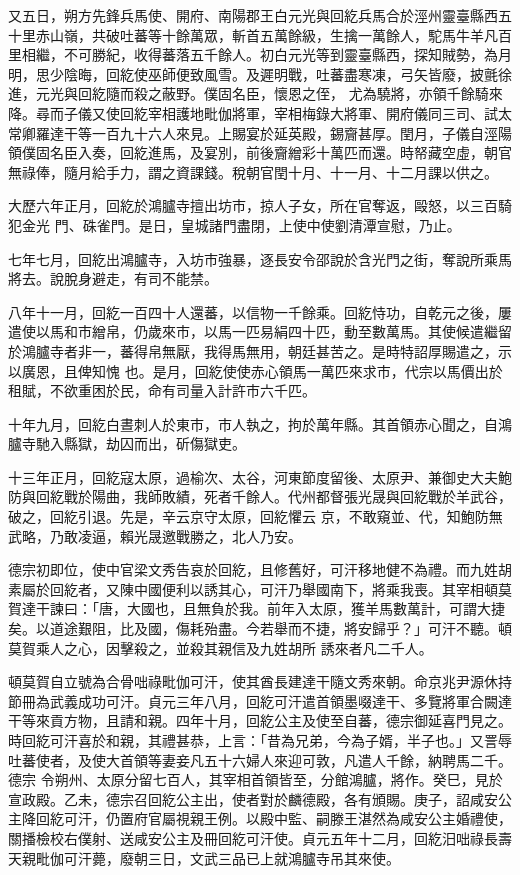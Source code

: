 \begin{pinyinscope}
 又五日，朔方先鋒兵馬使、開府、南陽郡王白元光與回紇兵馬合於涇州靈臺縣西五十里赤山嶺，共破吐蕃等十餘萬眾，斬首五萬餘級，生擒一萬餘人，駝馬牛羊凡百里相繼，不可勝紀，收得蕃落五千餘人。初白元光等到靈臺縣西，探知賊勢，為月明，思少陰晦，回紇使巫師便致風雪。及遲明戰，吐蕃盡寒凍，弓矢皆廢，披氈徐進，元光與回紇隨而殺之蔽野。僕固名臣，懷恩之侄，
 尤為驍將，亦領千餘騎來降。尋而子儀又使回紇宰相護地毗伽將軍，宰相梅錄大將軍、開府儀同三司、試太常卿羅達干等一百九十六人來見。上賜宴於延英殿，錫齎甚厚。閏月，子儀自涇陽領僕固名臣入奏，回紇進馬，及宴別，前後齎繒彩十萬匹而還。時帑藏空虛，朝官無祿俸，隨月給手力，謂之資課錢。稅朝官閏十月、十一月、十二月課以供之。



 大歷六年正月，回紇於鴻臚寺擅出坊市，掠人子女，所在官奪返，毆怒，以三百騎犯金光
 門、硃雀門。是日，皇城諸門盡閉，上使中使劉清潭宣慰，乃止。



 七年七月，回紇出鴻臚寺，入坊市強暴，逐長安令邵說於含光門之街，奪說所乘馬將去。說脫身避走，有司不能禁。



 八年十一月，回紇一百四十人還蕃，以信物一千餘乘。回紇恃功，自乾元之後，屢遣使以馬和市繒帛，仍歲來市，以馬一匹易絹四十匹，動至數萬馬。其使候遣繼留於鴻臚寺者非一，蕃得帛無厭，我得馬無用，朝廷甚苦之。是時特詔厚賜遣之，示以廣恩，且俾知愧
 也。是月，回紇使使赤心領馬一萬匹來求市，代宗以馬價出於租賦，不欲重困於民，命有司量入計許市六千匹。



 十年九月，回紇白晝刺人於東市，市人執之，拘於萬年縣。其首領赤心聞之，自鴻臚寺馳入縣獄，劫囚而出，斫傷獄吏。



 十三年正月，回紇寇太原，過榆次、太谷，河東節度留後、太原尹、兼御史大夫鮑防與回紇戰於陽曲，我師敗績，死者千餘人。代州都督張光晟與回紇戰於羊武谷，破之，回紇引退。先是，辛云京守太原，回紇懼云
 京，不敢窺並、代，知鮑防無武略，乃敢凌逼，賴光晟邀戰勝之，北人乃安。



 德宗初即位，使中官梁文秀告哀於回紇，且修舊好，可汗移地健不為禮。而九姓胡素屬於回紇者，又陳中國便利以誘其心，可汗乃舉國南下，將乘我喪。其宰相頓莫賀達干諫曰：「唐，大國也，且無負於我。前年入太原，獲羊馬數萬計，可謂大捷矣。以道途艱阻，比及國，傷耗殆盡。今若舉而不捷，將安歸乎？」可汗不聽。頓莫賀乘人之心，因擊殺之，並殺其親信及九姓胡所
 誘來者凡二千人。



 頓莫賀自立號為合骨咄祿毗伽可汗，使其酋長建達干隨文秀來朝。命京兆尹源休持節冊為武義成功可汗。貞元三年八月，回紇可汗遣首領墨啜達干、多覽將軍合闕達干等來貢方物，且請和親。四年十月，回紇公主及使至自蕃，德宗御延喜門見之。時回紇可汗喜於和親，其禮甚恭，上言：「昔為兄弟，今為子婿，半子也。」又詈辱吐蕃使者，及使大首領等妻妾凡五十六婦人來迎可敦，凡遣人千餘，納聘馬二千。德宗
 令朔州、太原分留七百人，其宰相首領皆至，分館鴻臚，將作。癸巳，見於宣政殿。乙未，德宗召回紇公主出，使者對於麟德殿，各有頒賜。庚子，詔咸安公主降回紇可汗，仍置府官屬視親王例。以殿中監、嗣滕王湛然為咸安公主婚禮使，關播檢校右僕射、送咸安公主及冊回紇可汗使。貞元五年十二月，回紇汨咄祿長壽天親毗伽可汗薨，廢朝三日，文武三品已上就鴻臚寺吊其來使。




\end{pinyinscope}
